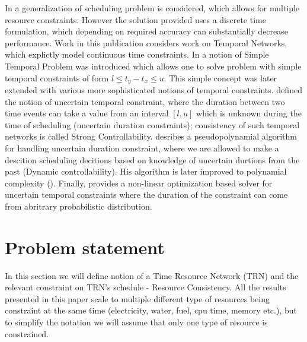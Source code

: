 \documentclass{article}
\begin{document}
\begin{multicols}{2}
In \cite{pritsker1969multiproject} a generalization of scheduling problem is considered, which allows for multiple resource constraints. However the solution provided uses a discrete time formulation, which depending on required accuracy can substantially decrease performance. Work in this publication considers work on Temporal Networks, which explictly model continuous time constraints. In \cite{dechter1991temporal} a notion of Simple Temporal Problem was introduced which allows one to solve problem with simple temporal constraints of form $l \leq t_y - t_x \leq u$. This simple concept was later extended with various more sophisticated notions of temporal constraints. \cite{vidal1996dealing} defined the notion of uncertain temporal constraint, where the duration between two time events can take a value from an interval $[l,u]$ which is unknown during the time of scheduling (uncertain duration constraints); consistency of such temporal networks is called Strong Controllability. \cite{morris2001dynamic} desribes a pseudopolynamial algorithm for handling uncertain duration constraint, where we are allowed to make a descition scheduling decitions based on knowledge of uncertain durtions from the past (Dynamic controllability). His algorithm is later improved to polynamial complexity (\cite{morris2005temporal}). Finally, \cite{Fang2014} provides a non-linear optimization based solver for uncertain temporal constraints where the duration of the constraint can come from abritrary probabilistic distribution.


\section{Problem statement}
In this section we will define notion of a Time Resource Network (TRN) and the relevant constraint on TRN's schedule - Resource Consistency. All the results presented in this paper scale to multiple different type of resources being constraint at the same time (electricity, water, fuel, cpu time, memory etc.), but to simplify the notation we will assume that only one type of resource is constrained.

\end{multicols}
\end{document}
